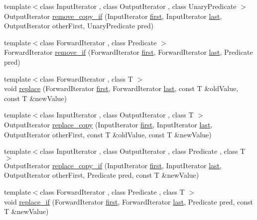\begin{DoxyCompactItemize}
\item 
{\footnotesize template$<$class Input\+Iterator , class Output\+Iterator , class Unary\+Predicate $>$ }\\Output\+Iterator \hyperlink{namespaceprism_abfc7da1f951e480a26d58fc098b78844}{remove\+\_\+copy\+\_\+if} (Input\+Iterator \hyperlink{namespaceprism_ae3fb7a1926a9e8e59300cd5e370470da}{first}, Input\+Iterator \hyperlink{namespaceprism_abe4956c4e865f55ca126b7fb973b5078}{last}, Output\+Iterator other\+First, Unary\+Predicate pred)
\item 
{\footnotesize template$<$class Forward\+Iterator , class Predicate $>$ }\\Forward\+Iterator \hyperlink{namespaceprism_a2e9d25191ed83ea0a193f16d9c0a00b7}{remove\+\_\+if} (Forward\+Iterator \hyperlink{namespaceprism_ae3fb7a1926a9e8e59300cd5e370470da}{first}, Forward\+Iterator \hyperlink{namespaceprism_abe4956c4e865f55ca126b7fb973b5078}{last}, Predicate pred)
\item 
{\footnotesize template$<$class Forward\+Iterator , class T $>$ }\\void \hyperlink{namespaceprism_a6156070b98de7130b8c912ae3a6d333f}{replace} (Forward\+Iterator \hyperlink{namespaceprism_ae3fb7a1926a9e8e59300cd5e370470da}{first}, Forward\+Iterator \hyperlink{namespaceprism_abe4956c4e865f55ca126b7fb973b5078}{last}, const T \&old\+Value, const T \&new\+Value)
\item 
{\footnotesize template$<$class Input\+Iterator , class Output\+Iterator , class T $>$ }\\Output\+Iterator \hyperlink{namespaceprism_a16d85ecb70d2f216714a0146a057a105}{replace\+\_\+copy} (Input\+Iterator \hyperlink{namespaceprism_ae3fb7a1926a9e8e59300cd5e370470da}{first}, Input\+Iterator \hyperlink{namespaceprism_abe4956c4e865f55ca126b7fb973b5078}{last}, Output\+Iterator other\+First, const T \&old\+Value, const T \&new\+Value)
\item 
{\footnotesize template$<$class Input\+Iterator , class Output\+Iterator , class Predicate , class T $>$ }\\Output\+Iterator \hyperlink{namespaceprism_a55d702599739f7137516dcd095119f15}{replace\+\_\+copy\+\_\+if} (Input\+Iterator \hyperlink{namespaceprism_ae3fb7a1926a9e8e59300cd5e370470da}{first}, Input\+Iterator \hyperlink{namespaceprism_abe4956c4e865f55ca126b7fb973b5078}{last}, Output\+Iterator other\+First, Predicate pred, const T \&new\+Value)
\item 
{\footnotesize template$<$class Forward\+Iterator , class Predicate , class T $>$ }\\void \hyperlink{namespaceprism_af118c19f6b5448319eb3aaf2d556ac54}{replace\+\_\+if} (Forward\+Iterator \hyperlink{namespaceprism_ae3fb7a1926a9e8e59300cd5e370470da}{first}, Forward\+Iterator \hyperlink{namespaceprism_abe4956c4e865f55ca126b7fb973b5078}{last}, Predicate pred, const T \&new\+Value)

\end{DoxyCompactItemize}
